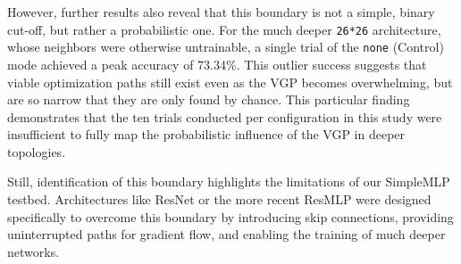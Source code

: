 \documentclass[conference]{IEEEtran}
\begin{document}
\begin{table}[h!]
\centering
\caption{Performance Collapse at the VGP Boundary (n=10). The \texttt{19*19} architecture remains salvageable by chance (utilizing \texttt{decay}), while the \texttt{20*20} architecture shows complete training failure across all modes.}
\label{tab:19v20_results}
\end{table}

However, further results also reveal that this boundary is not a simple, binary cut-off, but rather a probabilistic one. For the much deeper \texttt{26*26} architecture, whose neighbors were otherwise untrainable, a single trial of the \texttt{none} (Control) mode achieved a peak accuracy of 73.34\%. This outlier success suggests that viable optimization paths still exist even as the VGP becomes overwhelming, but are so narrow that they are only found by chance. This particular finding demonstrates that the ten trials conducted per configuration in this study were insufficient to fully map the probabilistic influence of the VGP in deeper topologies.

Still, identification of this boundary highlights the limitations of our SimpleMLP testbed. Architectures like ResNet\cite{b8} or the more recent ResMLP\cite{b9} were designed specifically to overcome this boundary by introducing skip connections, providing uninterrupted paths for gradient flow, and enabling the training of much deeper networks.
\end{document}
